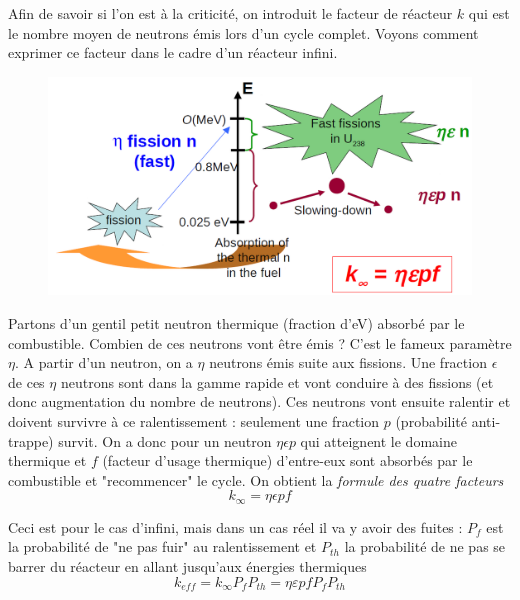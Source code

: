 \newpage
Afin de savoir si l'on est à la criticité, on introduit le facteur de réacteur $k$ qui est 
le nombre moyen de neutrons émis lors d'un cycle complet. Voyons comment exprimer ce facteur dans 
le cadre d'un réacteur infini. \\

	\begin{figure}
	\vspace{-5mm}
	\includegraphics[scale=0.3]{ch1/image7.png}
	\end{figure}
Partons d'un gentil petit neutron thermique (fraction d'eV) absorbé par le combustible. Combien 
de ces neutrons vont être émis ? C'est le fameux paramètre $\eta$. A partir d'un neutron, on a 
$\eta$ neutrons émis suite aux fissions. Une fraction $\epsilon$ de ces $\eta$ neutrons sont dans 
la gamme rapide et vont conduire à des fissions (et donc augmentation du nombre de neutrons). Ces
neutrons vont ensuite ralentir et doivent survivre à ce ralentissement : seulement une fraction 
$p$ (probabilité anti-trappe) survit. On a donc pour un neutron $\eta\epsilon p$ qui atteignent 
le domaine thermique et $f$ (facteur d'usage thermique) d'entre-eux sont absorbés par le combustible et "recommencer" le cycle. 
On obtient la \textit{formule des quatre facteurs}
\begin{equation}
k_\infty = \eta\epsilon  pf
\end{equation}

Ceci est pour le cas d'infini, mais dans un cas réel il va y avoir des fuites : $P_f$ est la 
probabilité de "ne pas fuir" au ralentissement et $P_{th}$ la probabilité de ne pas se barrer 
du réacteur en allant jusqu'aux énergies thermiques 
\begin{equation}
k_{eff} = k_\infty P_fP_{th} = \eta \varepsilon pfP_fP_{th}
\end{equation}

